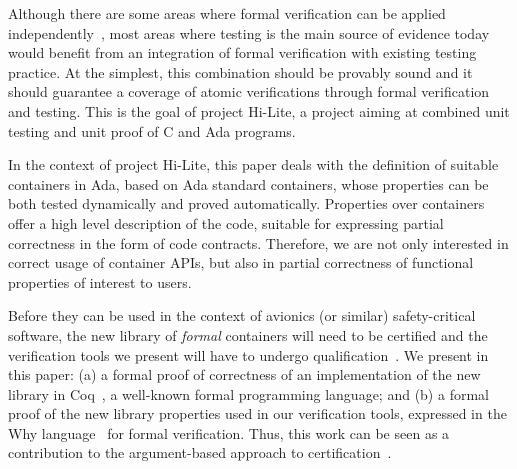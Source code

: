 \documentclass[runningheads,a4paper]{llncs}
\newcommand{\eg}{\textit{e.g.,}\xspace}
\begin{document}
Although there are some areas where formal verification can be applied
independently~\cite{souyris:2009:fm}, most areas where testing is the main
source of evidence today would benefit from an integration of formal
verification with existing testing practice. At the simplest, this
combination should be provably sound and it should guarantee a coverage of
atomic verifications through formal verification and testing. This is the goal
of project Hi-Lite, a project aiming at combined unit testing and unit proof of
C and Ada programs.

In the context of project Hi-Lite, this paper deals with the definition of
suitable containers in Ada, based on Ada standard containers, whose properties
can be both tested dynamically and proved automatically. Properties
over containers offer a high level description of the code,
suitable for expressing partial correctness in the form of code contracts. Therefore, we
are not only interested in correct usage of container APIs, but also in partial
correctness of functional properties of interest to users.

Before they can be used in the context of avionics (or similar) safety-critical
software, the new library of \textit{formal} containers will need to be certified
and the verification tools we present will have to undergo
qualification~\cite{standard:do-178b}. We present in this paper: (a) a formal
proof of correctness of an implementation of the new library in Coq~\cite{coq}, a
well-known formal programming language; and (b) a formal proof of the new
library properties used in our verification tools, expressed in the Why
language~\cite{why} for formal verification. Thus, this work can be seen as a contribution
to the argument-based approach to certification~\cite{rushby:2010:sss}.
\end{document}
